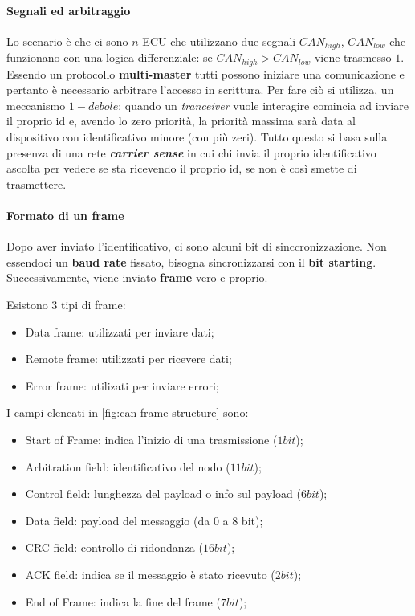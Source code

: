 \documentclass{article}
\begin{document}
\paragraph{Segnali ed arbitraggio}
Lo scenario è che ci sono $n$ ECU che utilizzano due segnali $CAN_{high}$, $CAN_{low}$ che funzionano con una logica differenziale: se $CAN_{high} > CAN_{low}$ viene trasmesso $1$. Essendo un protocollo \textbf{multi-master} tutti possono iniziare una comunicazione e pertanto è necessario arbitrare l'accesso in scrittura. Per fare ciò si utilizza, un meccanismo $1-debole$: quando un \textit{tranceiver} vuole interagire comincia ad inviare il proprio id e, avendo lo zero priorità, la priorità massima sarà data al dispositivo con identificativo minore (con più zeri). Tutto questo si basa sulla presenza di una rete \textbf{\textit{carrier sense}} in cui chi invia il proprio identificativo ascolta per vedere se sta ricevendo il proprio id, se non è così smette di trasmettere.

\paragraph{Formato di un frame}
Dopo aver inviato l'identificativo, ci sono alcuni bit di sinccronizzazione. Non essendoci un \textbf{baud rate} fissato, bisogna sincronizzarsi con il \textbf{bit starting}. Successivamente, viene inviato \textbf{frame} vero e proprio. 

Esistono $3$ tipi di frame:
\begin{itemize}
  \item Data frame: utilizzati per inviare dati;
  \item Remote frame: utilizzati per ricevere dati;
  \item Error frame: utilizati per inviare errori;
\end{itemize}

I campi elencati in \cref{fig:can-frame-structure} sono:
\begin{itemize}
  \item Start of Frame: indica l'inizio di una trasmissione ($1 bit$);
  \item Arbitration field: identificativo del nodo ($11 bit$);
  \item Control field: lunghezza del payload o info sul payload ($6 bit$);
  \item Data field: payload del messaggio (da $0$ a $8$ bit);
  \item CRC field: controllo di ridondanza ($16 bit$);
  \item ACK field: indica se il messaggio è stato ricevuto ($2 bit$);
  \item End of Frame: indica la fine del frame ($7 bit$);
\end{itemize}
\end{document}
